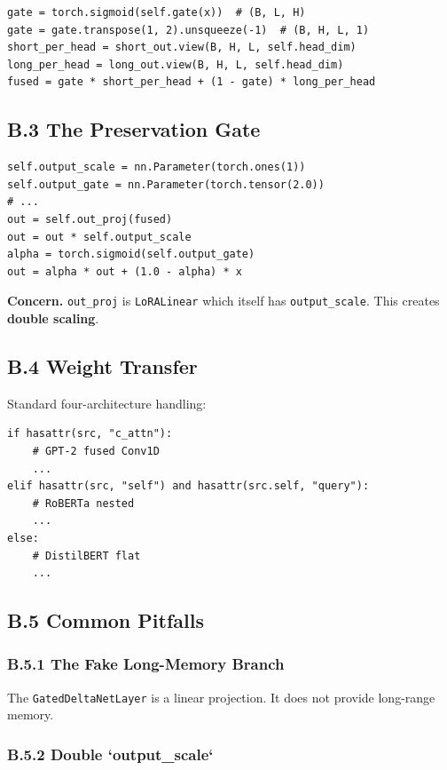 \begin{lstlisting}
gate = torch.sigmoid(self.gate(x))  # (B, L, H)
gate = gate.transpose(1, 2).unsqueeze(-1)  # (B, H, L, 1)
short_per_head = short_out.view(B, H, L, self.head_dim)
long_per_head = long_out.view(B, H, L, self.head_dim)
fused = gate * short_per_head + (1 - gate) * long_per_head
\end{lstlisting}

\subsection{B.3 The Preservation Gate}

\begin{lstlisting}
self.output_scale = nn.Parameter(torch.ones(1))
self.output_gate = nn.Parameter(torch.tensor(2.0))
# ...
out = self.out_proj(fused)
out = out * self.output_scale
alpha = torch.sigmoid(self.output_gate)
out = alpha * out + (1.0 - alpha) * x
\end{lstlisting}

\textbf{Concern.} \texttt{out\_proj} is \texttt{LoRALinear} which itself has \texttt{output\_scale}. 
This creates \textbf{double scaling}.

\subsection{B.4 Weight Transfer}

Standard four-architecture handling:

\begin{lstlisting}
if hasattr(src, "c_attn"):
    # GPT-2 fused Conv1D
    ...
elif hasattr(src, "self") and hasattr(src.self, "query"):
    # RoBERTa nested
    ...
else:
    # DistilBERT flat
    ...
\end{lstlisting}

\subsection{B.5 Common Pitfalls}

\subsubsection{B.5.1 The Fake Long-Memory Branch}

The \texttt{GatedDeltaNetLayer} is a linear projection. It does not provide long-range 
memory.

\subsubsection{B.5.2 Double `output\_scale`}

